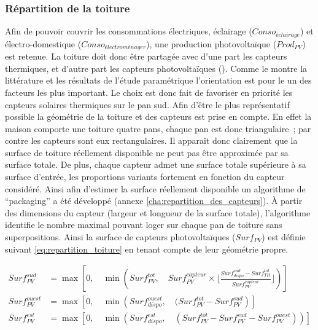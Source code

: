 \subsubsection{Répartition de la toiture} %
\label{ssub:repartition_de_la_toiture}
Afin de pouvoir couvrir les consommations électriques, éclairage ($Conso_{éclairage}$) et
électro-domestique ($Conso_{électroménager}$), une production photovoltaïque ($Prod_{PV}$)
est retenue. La toiture doit donc être partagée avec d’une part les capteurs thermiques, et
d’autre part les capteurs photovoltaïques (). Comme le montre la littérature et les résultats
de l’étude paramétrique l’orientation est pour le  un des facteurs les plus
important. Le choix est donc fait de favoriser en priorité les capteurs solaires
thermiques sur le pan sud. Afin d’être le plus représentatif possible la géométrie
de la toiture et des capteurs est prise en compte.
En effet la maison comporte une toiture quatre pans, chaque pan est donc triangulaire~; par
contre les capteurs sont eux rectangulaires. Il apparaît donc clairement que la surface
de toiture réellement disponible ne peut pas être approximée par sa surface totale.
De plus, chaque capteur admet une surface totale supérieure à sa surface d’entrée,
les proportions variants fortement en fonction du capteur considéré.
Ainsi afin d’estimer la surface réellement disponible un algorithme de \enquote{packaging}
a été développé (annexe \ref{cha:repartition_des_capteurs}). À partir des dimensions
du capteur (largeur et longueur de la surface totale), l’algorithme identifie le
nombre maximal pouvant loger sur chaque pan de toiture sans superpositions.
Ainsi la surface de capteurs photovoltaïques ($Surf_{PV}$) est définie suivant
\eqref{eq:repartition_toiture} en tenant compte de leur géométrie propre.

\begin{equation}\label{eq:repartition_toiture}
  \begin{aligned}
    Surf_{PV}^{sud}   &= \max\left[0,\quad \min \left(Surf_{PV}^{tot},\quad Surf_{PV}^{capteur} \times
                                                      \Bigg\lfloor\frac{Surf_{dispo}^{sud} - Surf_{TH}^{tot}}{Surf_{PV}^{capteur}}\Bigg\rfloor\right)
                                   \right] \\[10pt]
    Surf_{PV}^{ouest} &= \max \left[0,\quad \min\left(Surf_{dispo}^{ouest},\quad
                                                      (Surf_{PV}^{tot} - Surf_{PV}^{sud}\right)
                                    \right] \\[10pt]
    Surf_{PV}^{est} &= \max \left[0,\quad \min\left(Surf_{dispo}^{est},\quad
                                                    (Surf_{PV}^{tot} - Surf_{PV}^{sud} - Surf_{PV}^{ouest}) \right) \right] \\[10pt]
  \end{aligned}
\end{equation}

